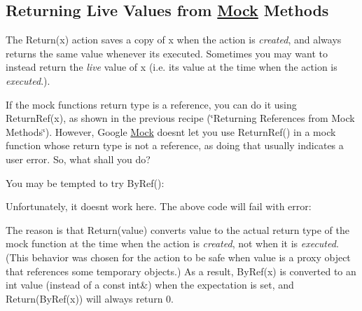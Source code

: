 \subsection*{Returning Live Values from \mbox{\hyperlink{class_mock}{Mock}} Methods}

The {\ttfamily Return(x)} action saves a copy of {\ttfamily x} when the action is {\itshape created}, and always returns the same value whenever it\textquotesingle{}s executed. Sometimes you may want to instead return the {\itshape live} value of {\ttfamily x} (i.\+e. its value at the time when the action is {\itshape executed}.).

If the mock function\textquotesingle{}s return type is a reference, you can do it using {\ttfamily Return\+Ref(x)}, as shown in the previous recipe (\char`\"{}\+Returning References
from Mock Methods\char`\"{}). However, Google \mbox{\hyperlink{class_mock}{Mock}} doesn\textquotesingle{}t let you use {\ttfamily Return\+Ref()} in a mock function whose return type is not a reference, as doing that usually indicates a user error. So, what shall you do?

You may be tempted to try {\ttfamily By\+Ref()}\+:


\begin{DoxyCode}{0}
\DoxyCodeLine{}
\DoxyCodeLine{\};}
\end{DoxyCode}


Unfortunately, it doesn\textquotesingle{}t work here. The above code will fail with error\+:


\begin{DoxyCode}{0}
\end{DoxyCode}


The reason is that {\ttfamily Return(value)} converts {\ttfamily value} to the actual return type of the mock function at the time when the action is {\itshape created}, not when it is {\itshape executed}. (This behavior was chosen for the action to be safe when {\ttfamily value} is a proxy object that references some temporary objects.) As a result, {\ttfamily By\+Ref(x)} is converted to an {\ttfamily int} value (instead of a {\ttfamily const int\&}) when the expectation is set, and {\ttfamily Return(\+By\+Ref(x))} will always return 0.

